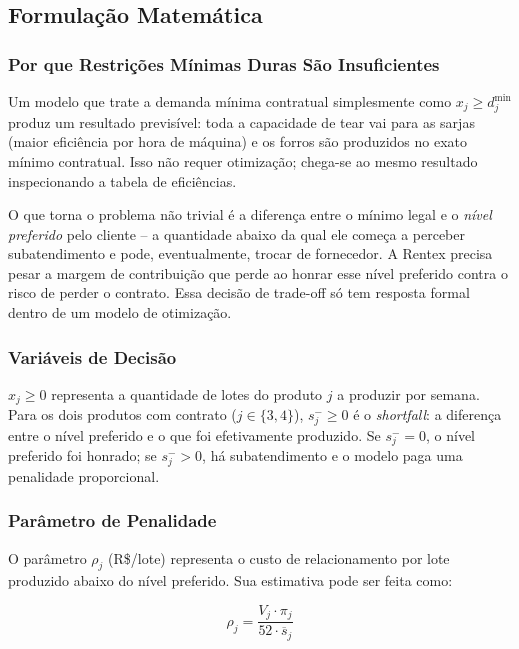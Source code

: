\newpage

\subsection{Formulação Matemática}
\label{sec:form_final}

\subsubsection{Por que Restrições Mínimas Duras São Insuficientes}

Um modelo que trate a demanda mínima contratual simplesmente como $x_j \geq
d_j^{\min}$ produz um resultado previsível: toda a capacidade de tear vai para
as sarjas (maior eficiência por hora de máquina) e os forros são produzidos no
exato mínimo contratual. Isso não requer otimização; chega-se ao mesmo resultado
inspecionando a tabela de eficiências.

O que torna o problema não trivial é a diferença entre o mínimo legal e o
\textit{nível preferido} pelo cliente -- a quantidade abaixo da qual ele começa
a perceber subatendimento e pode, eventualmente, trocar de fornecedor. A Rentex
precisa pesar a margem de contribuição que perde ao honrar esse nível preferido
contra o risco de perder o contrato. Essa decisão de trade-off só tem resposta
formal dentro de um modelo de otimização.

\subsubsection{Variáveis de Decisão}

$x_j \geq 0$ representa a quantidade de lotes do produto $j$ a produzir por
semana. Para os dois produtos com contrato ($j \in \{3, 4\}$), $s_j^- \geq 0$
é o \textit{shortfall}: a diferença entre o nível preferido e o que foi
efetivamente produzido. Se $s_j^- = 0$, o nível preferido foi honrado; se
$s_j^- > 0$, há subatendimento e o modelo paga uma penalidade proporcional.

\subsubsection{Parâmetro de Penalidade}

O parâmetro $\rho_j$ (R\$/lote) representa o custo de relacionamento por lote
produzido abaixo do nível preferido. Sua estimativa pode ser feita como:

\begin{equation}
  \rho_j = \frac{V_j \cdot \pi_j}{52 \cdot \overline{s}_j}
  \label{eq:rho}
\end{equation}

